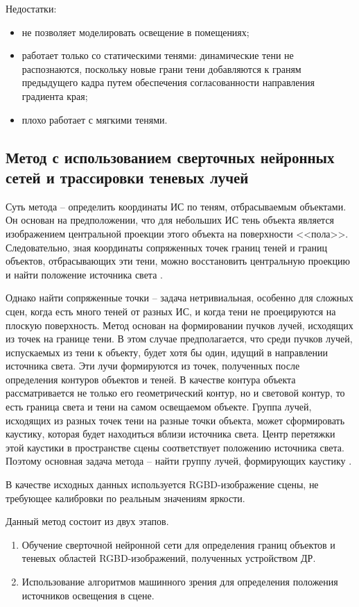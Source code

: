Недостатки:
\begin{itemize}
	\item не позволяет моделировать освещение в помещениях;
	\item работает только со статическими тенями: динамические тени не распознаются, поскольку новые грани тени добавляются к граням предыдущего кадра путем обеспечения согласованности направления градиента края;
	\item плохо работает с мягкими тенями.
\end{itemize}


\subsection{Метод с использованием сверточных нейронных сетей и трассировки теневых лучей}

Суть метода -- определить координаты ИС по теням, отбрасываемым объектами. Он основан на предположении, что для небольших ИС тень объекта является изображением центральной проекции этого объекта на поверхности <<пола>>. Следовательно, зная координаты сопряженных точек границ теней и границ объектов, отбрасывающих эти тени, можно восстановить центральную проекцию и найти положение источника света \cite{sns_tras}.

Однако найти сопряженные точки -- задача нетривиальная, особенно для сложных сцен, когда есть много теней от разных ИС, и когда тени не проецируются на плоскую поверхность. Метод основан на формировании пучков лучей, исходящих из точек на границе тени. В этом случае предполагается, что среди пучков лучей, испускаемых из тени к объекту, будет хотя бы один, идущий в направлении источника света. Эти лучи формируются из точек, полученных после определения контуров объектов и теней. В качестве контура объекта рассматривается не только его геометрический контур, но и световой контур, то есть граница света и тени на самом освещаемом объекте. Группа лучей, исходящих из разных точек тени на разные точки объекта, может сформировать каустику, которая будет находиться вблизи источника света. Центр перетяжки этой каустики в пространстве сцены соответствует положению источника света. Поэтому основная задача метода -- найти группу лучей, формирующих каустику \cite{sns_tras}.

В качестве исходных данных используется RGBD-изображение сцены, не требующее калибровки по реальным значениям яркости.

Данный метод состоит из двух этапов.
\begin{enumerate}
	\item Обучение сверточной нейронной сети для определения границ объектов и теневых областей RGBD-изображений, полученных устройством ДР.
	\item Использование алгоритмов машинного зрения для определения положения источников освещения в сцене.
\end{enumerate}

